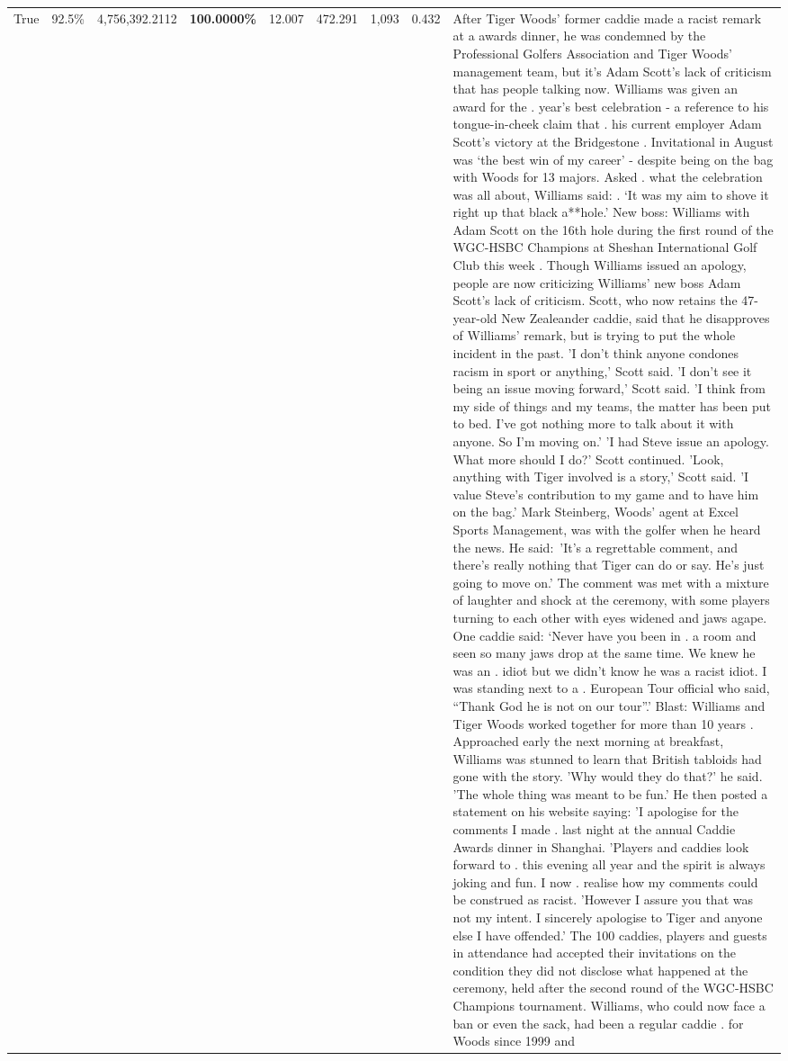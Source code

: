 \begin{table}[H]
\begin{tabular}{lllrlllll}
True & 92.5\% & 4,756,392.2112 & \bfseries \color{red} 100.0000\% & 12.007 & 472.291 & 1,093 & 0.432 & After Tiger Woods' former caddie made a racist remark at a awards dinner, he was condemned by the Professional Golfers Association and Tiger Woods' management team, but it's Adam Scott's lack of criticism that has people talking now. Williams was given an award for the . year’s best celebration - a reference to his tongue-in-cheek claim that . his current employer Adam Scott’s victory at the Bridgestone . Invitational in August was ‘the best win of my career’ - despite being on the bag with Woods for 13 majors. Asked . what the celebration was all about, Williams said: . ‘It was my aim to shove it right up that black a**hole.’ New boss: Williams with Adam Scott  on the 16th hole during the first round of the WGC-HSBC Champions at Sheshan International Golf Club this week . Though Williams issued an apology, people are now criticizing Williams' new boss Adam Scott's lack of criticism. Scott, who now retains the 47-year-old New Zealeander caddie, said that he disapproves of Williams' remark, but is trying to put the whole incident in the past. 'I don't think anyone condones racism in sport or anything,' Scott said. 'I don't see it being an issue moving forward,' Scott said. 'I think from my side of things and my teams, the matter has been put to bed. I've got nothing more to talk about it with anyone. So I'm moving on.' 'I had Steve issue an apology. What more should I do?' Scott continued. 'Look, anything with Tiger involved is a story,' Scott said. 'I value Steve's contribution to my game and to have him on the bag.' Mark Steinberg, Woods' agent at Excel Sports Management, was with the golfer when he heard the news. He said: 'It's a regrettable comment, and there's really nothing that Tiger can do or say. He's just going to move on.' The comment was met with a mixture of laughter and shock at the ceremony, with some players turning to each other with eyes widened and jaws agape. One caddie said: ‘Never have you been in . a room and seen so many jaws drop at the same time. We knew he was an . idiot but we didn’t know he was a racist idiot. I was standing next to a . European Tour official who said, “Thank God he is not on our tour”.’ Blast: Williams and Tiger Woods worked together for more than 10 years . Approached early the next morning at breakfast, Williams was stunned to learn that British tabloids had gone with the story. 'Why would they do that?' he said. 'The whole thing was meant to be fun.' He then posted a statement on his website saying: 'I apologise for the comments I made . last night at the annual Caddie Awards dinner in Shanghai. 'Players and caddies look forward to . this evening all year and the spirit is always joking and fun. I now . realise how my comments could be construed as racist. 'However I assure you that was not my intent. I sincerely apologise to Tiger and anyone else I have offended.' The 100 caddies, players and guests in attendance had accepted their invitations on the condition they did not disclose what happened at the ceremony, held after the second round of the WGC-HSBC Champions tournament. Williams, who could now face a ban or even the sack, had been a regular caddie . for Woods since 1999 and 
\end{tabular}
\end{table}
